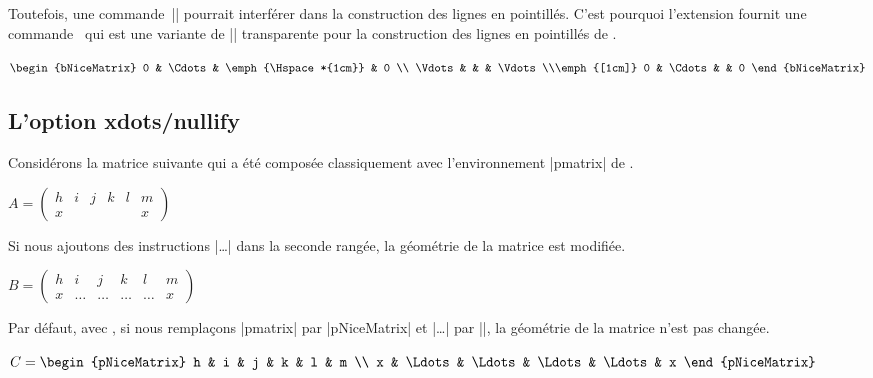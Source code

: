 \documentclass[dvipsnames]{article}
\begin{document}
Toutefois, une commande~|\hspace*| pourrait interférer dans la construction des
lignes en pointillés. C'est pourquoi l'extension  fournit une
commande~ qui est une variante de |\hspace|
transparente pour la construction des lignes en pointillés de .

\nobreak
\medskip
\begin{Code}[width=10cm,show-output]
$\begin{bNiceMatrix}
0      & \Cdots & \emph{\Hspace*{1cm}} & 0      \\
\Vdots &        &               & \Vdots \\\emph{[1cm]}
0      & \Cdots &               & 0
\end{bNiceMatrix}$
\end{Code}

\subsection{L'option xdots/nullify}

\label{nullify-dots}

Considérons la matrice suivante qui a été composée classiquement avec
l'environnement |{pmatrix}| de .

\nobreak
\medskip
\begin{Code}[width=10cm,show-output]
$A = \begin{pmatrix}
h & i & j & k & l & m \\
x &   &   &   &   & x
\end{pmatrix}$
\end{Code}

\medskip
Si nous ajoutons des instructions |\ldots| dans la seconde rangée, la géométrie
de la matrice est modifiée.

\nobreak
\medskip
\begin{Code}[width=10cm,show-output]
$B = \begin{pmatrix}
h & i & j & k & l & m \\
x & \ldots & \ldots  & \ldots & \ldots & x
\end{pmatrix}$
\end{Code}

\medskip
Par défaut, avec , si nous remplaçons |{pmatrix}| par
|{pNiceMatrix}| et |\ldots| par |\Ldots|, la géométrie de la matrice n'est pas
changée.

\nobreak
\medskip
\begin{Code}[width=10cm,show-output]
$C = \begin{pNiceMatrix}
h & i & j & k & l & m \\
x & \Ldots & \Ldots & \Ldots & \Ldots & x
\end{pNiceMatrix}$
\end{Code}
\end{document}
